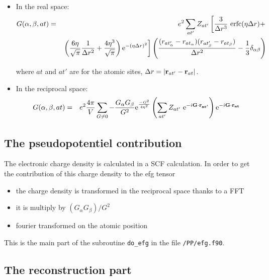 \documentclass[11pt, a4paper]{article}
\begin{document}
\begin{itemize}
\item In the real space:
\begin{eqnarray}
G(\alpha, \beta, at) & = & e^2 \sum_{at'} Z_{at'} \left[
\frac{3}{\Delta r^3}\ {\rm erfc}(\eta \Delta r) + \right. \nonumber \\
&& \left. \left(\frac{6 \eta}{\sqrt{\pi}} \frac{1}{\Delta r^2} +
\frac{4 \eta^3}{\sqrt{\pi}} \right) {\rm e}^{-(\eta \Delta r)^2}
\right] \left(\frac{(r_{at'_\alpha} - r_{at_\alpha}) (r_{at'_\beta} -
r_{at_\beta})} {\Delta r^2} - \frac{1}{3} \delta_{\alpha \beta}
\right)
\end{eqnarray}

where $at$ and $at'$ are for the atomic sites, $\Delta r = |{\bf
r}_{at'} - {\bf r}_{at}|$.

\item In the reciprocal space:
\begin{eqnarray}
G(\alpha, \beta, at) & = & e^2 \frac{4 \pi}{V} \sum_{G \ne 0} -
\frac{G_\alpha G_\beta}{G^2} {\rm e}^{\frac{-G^2}{4\eta^2}} \left(
\sum_{at'} Z_{at'}\ {\rm e}^{-i{\bf G}\cdot{\bf r_{at'}}} \right) {\rm
e}^{-i{\bf G}\cdot{\bf r_{at}}}
\end{eqnarray}

\end{itemize}
 
\subsection{The pseudopotentiel contribution}

The electronic charge density is calculated in a SCF calculation. In
order to get the contribution of this charge density to the efg tensor
\begin{itemize}
\item the charge density is transformed in the reciprocal space thanks
to a FFT
\item it is multiply by $(G_\alpha G_\beta)/{G^2}$
\item fourier transformed on the atomic position
\end{itemize}

This is the main part of the subroutine \verb+do_efg+ in the file
\verb+/PP/efg.f90+.

\subsection{The reconstruction part}
\end{document}
